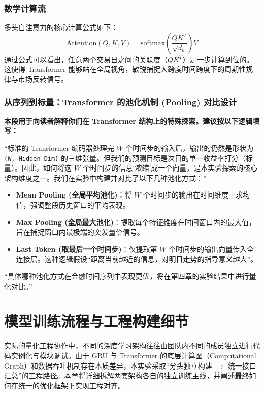 \documentclass[9pt,a4paper,twoside]{rho-class/rho}
\begin{document}
    \subsubsection{数学计算流}
    多头自注意力的核心计算公式如下：
    \begin{equation}
        \text{Attention}(Q, K, V) = \text{softmax}\left(\frac{QK^T}{\sqrt{d_k}}\right)V
    \end{equation}
    通过公式可以看出，任意两个交易日之间的关联度（$QK^T$）是一步计算到位的。这使得 Transformer 能够站在全局视角，敏锐捕捉大跨度时间跨度下的周期性规律与市场反转信号。

    \subsubsection{从序列到标量：Transformer 的池化机制 (Pooling) 对比设计}
    \begin{rhoenv}[frametitle=填写建议：池化机制解释]
    \textbf{本段用于向读者解释你们在 Transformer 结构上的特殊探索。建议按以下逻辑填写：}
    
    “标准的 Transformer 编码器处理完 $W$ 个时间步的输入后，输出的仍然是形状为 \texttt{(W, Hidden\_Dim)} 的三维张量。但我们的预测目标是次日的单一收益率打分（标量）。因此，如何将这 $W$ 个时间步的信息‘浓缩’成一个向量，是本实验探索的核心架构维度之一。我们在实验中构建并对比了以下几种池化方式：”
    \begin{itemize}
        \item \textbf{Mean Pooling (全局平均池化)}：将 $W$ 个时间步的输出在时间维度上求均值，强调整段历史窗口的平均表现。
        \item \textbf{Max Pooling (全局最大池化)}：提取每个特征维度在时间窗口内的最大值，旨在捕捉窗口内最极端的突发量价信号。
        \item \textbf{Last Token (取最后一个时间步)}：仅提取第 $W$ 个时间步的输出向量传入全连接层。这种逻辑假设“距离当前越近的信息，对明日走势的指导意义越大”。
    \end{itemize}
    “具体哪种池化方式在金融时间序列中表现更优，将在第四章的实验结果中进行量化对比。”
    \end{rhoenv}

\section{模型训练流程与工程构建细节}
实际的量化工程协作中，不同的深度学习架构往往由团队内不同的成员独立进行代码实例化与模块调试。由于 GRU 与 Transformer 的底层计算图（Computational Graph）和数据吞吐机制存在本质差异，本实验采取“分头独立构建 $\rightarrow$ 统一接口汇总”的工程路径。本章将详细拆解两套架构各自的独立训练主线，并阐述最终如何在统一的优化框架下实现工程对齐。
\end{document}
